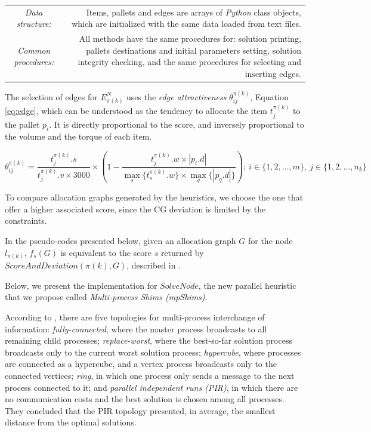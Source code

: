 \documentclass[preprint,authoryear]{elsarticle}
\begin{document}
\bgroup
\def\arraystretch{1.2}
\begin{table}[H]
	\centering
	\small
	\begin{tabular}{CD}
		
		{\it Data structure:}     & Items, pallets and edges are arrays of \emph{Python} class objects, which are initialized with the same data loaded from text files. \\
				
		{\it Common procedures:}  & All methods have the same procedures for: solution printing, pallets destinations and initial parameters setting, solution integrity checking, and the same procedures for selecting and inserting edges.\\

	\end{tabular}
	\normalsize
\end{table}
\egroup

The selection of edges for $E^N_{\pi(k)}$\/ uses the {\it edge attractiveness}\/ $\theta^{\pi(k)}_{ij}$, Equation \ref{eq:edge}, which can be understood as the tendency to allocate the item $t^{\pi(k)}_j$\/ to the pallet $p_i$. It is directly proportional to the score, and inversely proportional to the volume and the torque of each item. 

\begin{equation} \label{eq:edge}
	\theta^{\pi(k)}_{ij}= \frac{t^{\pi(k)}_j.s}{t^{\pi(k)}_j.v \times 3000}\times(1-\frac{t^{\pi(k)}_j.w\times|p_i.d|}{\max_s\{t^{\pi(k)}_s.w\}\times\max_q\{|p_q.d|\}});\ i \in \{1,2,\ldots,m\},\ j \in \{1,2,\ldots,n_k\}
\end{equation} 

To compare allocation graphs generated by the heuristics, we choose the one that offer a higher associated score, since the CG deviation is limited by the constraints.

In the pseudo-codes presented below, given an allocation graph $G$\/ for the node $l_{\pi(k)}$, $f_s(G)$\/ is equivalent to the score $s$\/ returned by $ScoreAndDeviation({\pi(k)},G) $, described in \cite{MesquitaSanches2023}.

Below, we present the implementation for $SolveNode$, the new parallel heuristic that we propose called {\it Multi-process Shims (mpShims)}.

According to \cite[p.226]{manfrin2006}, there are five topologies for multi-process interchange of information: {\it fully-connected}, where the master process broadcasts to all remaining child processes; {\it replace-worst}, where the best-so-far solution process broadcasts only to the current worst solution process; {\it hypercube}, where processes are connected as a hypercube, and a vertex process broadcasts only to the connected vertices; {\it ring}, in which one process only sends a message to the next process connected to it; and {\it parallel independent runs (PIR)}, in which there are no communication costs and the best solution is chosen among all processes. They concluded that the PIR topology presented, in average, the smallest distance from the optimal solutions.
\end{document}
